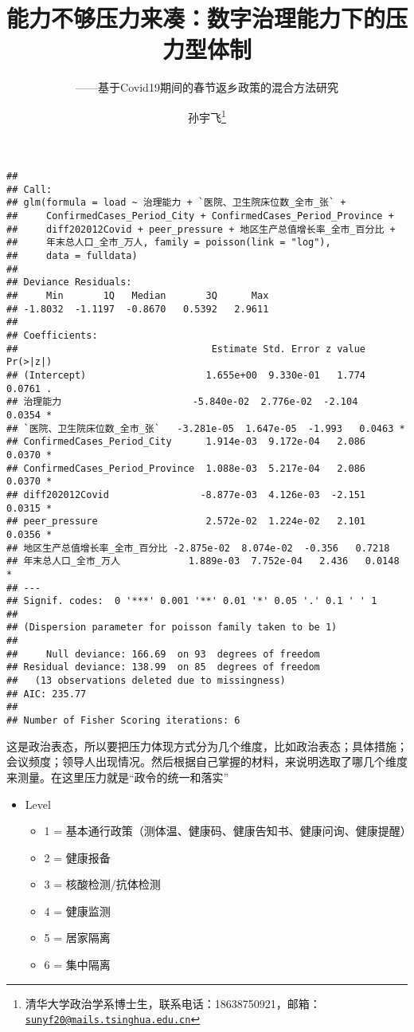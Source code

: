 \documentclass[
  12pt,
]{ctexart}
\title{能力不够压力来凑：数字治理能力下的压力型体制}
\subtitle{------基于Covid19期间的春节返乡政策的混合方法研究}
\author{孙宇飞\footnote{清华大学政治学系博士生，联系电话：18638750921，邮箱：\href{mailto:sunyf20@mails.tsinghua.edu.cn}{\nolinkurl{sunyf20@mails.tsinghua.edu.cn}}}}
\date{}
\providecommand{\tightlist}{%
  \setlength{\itemsep}{0pt}\setlength{\parskip}{0pt}}
\begin{document}
\maketitle

\begin{verbatim}
## 
## Call:
## glm(formula = load ~ 治理能力 + `医院、卫生院床位数_全市_张` + 
##     ConfirmedCases_Period_City + ConfirmedCases_Period_Province + 
##     diff202012Covid + peer_pressure + 地区生产总值增长率_全市_百分比 + 
##     年末总人口_全市_万人, family = poisson(link = "log"), 
##     data = fulldata)
## 
## Deviance Residuals: 
##     Min       1Q   Median       3Q      Max  
## -1.8032  -1.1197  -0.8670   0.5392   2.9611  
## 
## Coefficients:
##                                  Estimate Std. Error z value Pr(>|z|)  
## (Intercept)                     1.655e+00  9.330e-01   1.774   0.0761 .
## 治理能力                       -5.840e-02  2.776e-02  -2.104   0.0354 *
## `医院、卫生院床位数_全市_张`   -3.281e-05  1.647e-05  -1.993   0.0463 *
## ConfirmedCases_Period_City      1.914e-03  9.172e-04   2.086   0.0370 *
## ConfirmedCases_Period_Province  1.088e-03  5.217e-04   2.086   0.0370 *
## diff202012Covid                -8.877e-03  4.126e-03  -2.151   0.0315 *
## peer_pressure                   2.572e-02  1.224e-02   2.101   0.0356 *
## 地区生产总值增长率_全市_百分比 -2.875e-02  8.074e-02  -0.356   0.7218  
## 年末总人口_全市_万人            1.889e-03  7.752e-04   2.436   0.0148 *
## ---
## Signif. codes:  0 '***' 0.001 '**' 0.01 '*' 0.05 '.' 0.1 ' ' 1
## 
## (Dispersion parameter for poisson family taken to be 1)
## 
##     Null deviance: 166.69  on 93  degrees of freedom
## Residual deviance: 138.99  on 85  degrees of freedom
##   (13 observations deleted due to missingness)
## AIC: 235.77
## 
## Number of Fisher Scoring iterations: 6
\end{verbatim}

这是政治表态，所以要把压力体现方式分为几个维度，比如政治表态；具体措施；会议频度；领导人出现情况。然后根据自己掌握的材料，来说明选取了哪几个维度来测量。在这里压力就是``政令的统一和落实''

\begin{itemize}
\tightlist
\item
  Level

  \begin{itemize}
  \tightlist
  \item
    1 = 基本通行政策（测体温、健康码、健康告知书、健康问询、健康提醒）
  \item
    2 = 健康报备
  \item
    3 = 核酸检测/抗体检测
  \item
    4 = 健康监测
  \item
    5 = 居家隔离
  \item
    6 = 集中隔离
  \end{itemize}
\end{itemize}
\end{document}
